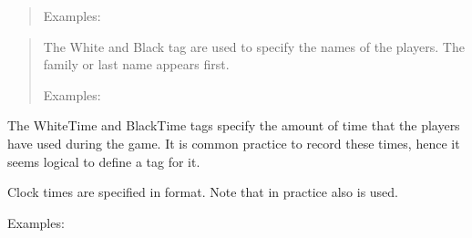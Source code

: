\documentclass[letterpaper,10pt,english]{sphinxmanual}
\begin{document}
\sphinxAtStartPar
{}
\begin{quote}

\sphinxAtStartPar
Examples:

\begin{sphinxVerbatim}[commandchars=\\\{\}]
\PYG{p}{[} \PYG{p}{]}
\PYG{p}{[} \PYG{p}{]}
\PYG{p}{[} \PYG{p}{]}
\end{sphinxVerbatim}
\end{quote}

\sphinxAtStartPar
{}
\begin{quote}

\sphinxAtStartPar
The White and Black tag are used to specify the names of the players.
The family or last name appears first.

\sphinxAtStartPar
Examples:

\begin{sphinxVerbatim}[commandchars=\\\{\}]
\PYG{p}{[} \PYG{p}{]}
\PYG{p}{[} \PYG{p}{]}
\PYG{p}{[} \PYG{p}{]}
\PYG{p}{[} \PYG{p}{]}
\end{sphinxVerbatim}
\end{quote}
\begin{description}
\sphinxAtStartPar
The WhiteTime and BlackTime tags specify the amount of time that the players
have used during the game. It is common practice to record these times, hence
it seems logical to define a tag for it.

\sphinxAtStartPar
Clock times are specified in  format. Note that in practice also
 is used.

\sphinxAtStartPar
{}

\sphinxAtStartPar
Examples:

\begin{sphinxVerbatim}[commandchars=\\\{\}]
\PYG{p}{[} \PYG{p}{]}
\PYG{p}{[} \PYG{p}{]}
\end{sphinxVerbatim}

\end{description}
\end{document}
